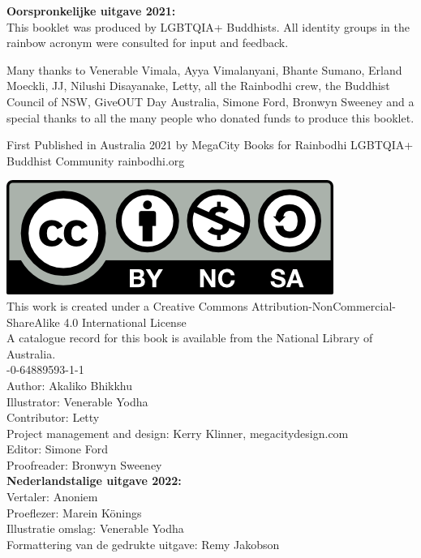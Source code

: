 \documentclass[12pt,openany]{book}
\begin{document}
{\footnotesize
\begin{center}
\noindent \textbf{Oorspronkelijke uitgave 2021:} 
\\
This booklet was produced by LGBTQIA+ Buddhists. All identity groups in the rainbow acronym were consulted for input and feedback.

\noindent Many thanks to Venerable Vimala, Ayya Vimalanyani, Bhante Sumano, Erland Moeckli, JJ, Nilushi Disayanake, Letty, all the Rainbodhi crew, the Buddhist Council of NSW, GiveOUT Day Australia, Simone Ford, Bronwyn Sweeney and a special thanks to all the many people who donated funds to produce this booklet.
\medskip

\noindent First Published in Australia 2021
by MegaCity Books
for Rainbodhi LGBTQIA+ Buddhist Community
rainbodhi.org



\noindent
\includegraphics{by-nc-sa} \\
This work is created under a Creative Commons Attribution-NonCommercial-ShareAlike 4.0 International License \\
\medskip
\noindent A catalogue record for this book is available from the National Library of Australia. \\
\medskip
{}-0-64889593-1-1 \\
\medskip
Author: Akaliko Bhikkhu \\
Illustrator: Venerable Yodha \\
Contributor: Letty \\
Project management and design: Kerry Klinner, megacitydesign.com \\
Editor: Simone Ford \\
Proofreader: Bronwyn Sweeney
\medskip \\
\textbf{Nederlandstalige uitgave 2022:}  \\
Vertaler: Anoniem \\
Proeflezer: Marein Könings \\
Illustratie omslag: Venerable Yodha \\
Formattering van de gedrukte uitgave: Remy Jakobson
\end{center}
}
\end{document}
